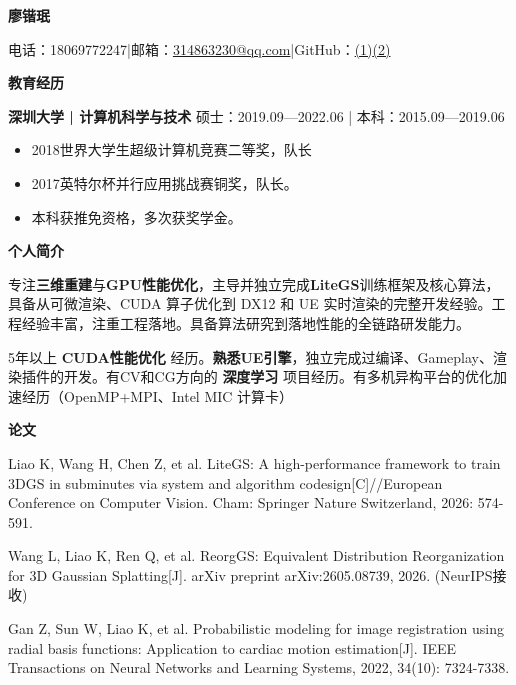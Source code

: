 \documentclass[10pt,a4paper]{article}
\newcommand{\ressection}[1]{
    \par 
    \vspace{5pt}
    {\color{accent} \fontsize{13}{13}\selectfont \bfseries #1}\par\vspace{-10pt}{\color{rulegray}\rule{\linewidth}{0.5pt}} 
    \par 
    \vspace{-5pt}}
\newcommand{\company}[2]{
    \par \vspace{10pt}
    {\fontsize{11}{11}\selectfont\bfseries #1}
    \hfill
    {\color{muted}\fontsize{10}{10}\selectfont #2}
    \par}
\begin{document}
{\fontsize{20}{20}\selectfont\bfseries 廖锴珉}\par
{\fontsize{8.6}{11.5}\selectfont 电话：18069772247\enspace |\enspace 邮箱：\href{mailto:314863230@qq.com}{314863230@qq.com}\enspace |\enspace GitHub：\href{https://github.com/KaiminLiao}{(1)}\enspace\href{https://github.com/liaoKM}{(2)}}\par
\vspace{-10pt}{\color{accent}\rule{\linewidth}{1pt}}\par

\ressection{教育经历}
\company{\textbf{深圳大学 | 计算机科学与技术}} {硕士：2019.09—2022.06 | 本科：2015.09—2019.06}
\begin{itemize}
\item 2018世界大学生超级计算机竞赛二等奖，队长
\item 2017英特尔杯并行应用挑战赛铜奖，队长。
\item 本科获推免资格，多次获奖学金。
\end{itemize}

\ressection{个人简介}
专注\textbf{三维重建}与\textbf{GPU性能优化}，主导并独立完成\textbf{LiteGS}训练框架及核心算法，具备从可微渲染、CUDA 算子优化到 DX12 和 UE 实时渲染的完整开发经验。工程经验丰富，注重工程落地。具备算法研究到落地性能的全链路研发能力。\par
5年以上 \textbf{CUDA性能优化} 经历。\textbf{熟悉UE引擎}，独立完成过编译、Gameplay、渲染插件的开发。有CV和CG方向的 \textbf{深度学习} 项目经历。有多机异构平台的优化加速经历（OpenMP+MPI、Intel MIC 计算卡）\par

\ressection{论文}
{\fontsize{10}{10}\selectfont Liao K, Wang H, Chen Z, et al. LiteGS: A high-performance framework to train 3DGS in subminutes via system and algorithm codesign[C]//European Conference on Computer Vision. Cham: Springer Nature Switzerland, 2026: 574-591.\par}

{\fontsize{10}{10}\selectfont Wang L, Liao K, Ren Q, et al. ReorgGS: Equivalent Distribution Reorganization for 3D Gaussian Splatting[J]. arXiv preprint arXiv:2605.08739, 2026. (NeurIPS接收)\par}

{\fontsize{10}{10}\selectfont Gan Z, Sun W, Liao K, et al. Probabilistic modeling for image registration using radial basis functions: Application to cardiac motion estimation[J]. IEEE Transactions on Neural Networks and Learning Systems, 2022, 34(10): 7324-7338.\par}
\end{document}
